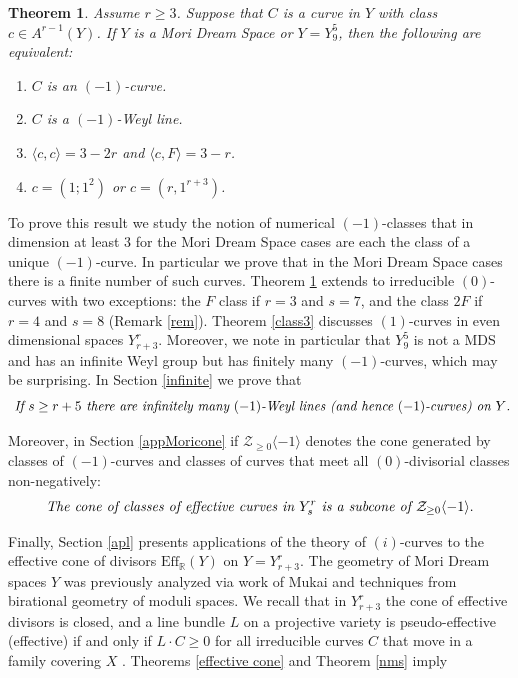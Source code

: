 \documentclass[12pt]{article}
\newtheorem{theorem}[equation]{Theorem}
\numberwithin{equation}{section}
\numberwithin{subeq}{equation}
\def\bbR{\mathbb{R}}
\begin{document}
\begin{theorem}\label{class}
Assume $r \geq 3$.  
Suppose that $C$ is a curve in $Y$ with class $c\in A^{r-1}(Y)$.
If $Y$ is a Mori Dream Space or $Y=Y^5_9$,
then the following are equivalent:
\begin{enumerate}
\item $C$ is an $(-1)$-curve.
\item $C$ is a $(-1)$-Weyl line.
\item $\langle c, c \rangle=3-2r$ and $\langle c, F \rangle = 3-r$.
\item $c = (1;1^2)$ or $c=(r,1^{r+3})$.
\end{enumerate}
\end{theorem}

To prove this result we study the notion of numerical $(-1)$-classes
that in dimension at least $3$ for the Mori Dream Space cases 
are each the class of a unique $(-1)$-curve.
In particular we prove that in the Mori Dream Space cases there is a finite number of such curves.
Theorem \ref{class} extends to irreducible $(0)$-curves with two exceptions:
the $F$ class if $r=3$ and $s=7$, and the class $2F$ if $r=4$ and $s=8$ (Remark \ref{rem}).
 Theorem \ref{class3} discusses $(1)$-curves in even dimensional spaces $Y^r_{r+3}$. Moreover, we note in particular that $Y^5_9$ is not a MDS and has an infinite Weyl group
but has finitely many $(-1)$-curves, which may be surprising. In Section \ref{infinite} we prove that
\[
\text{\emph{ If $s\geq r+5$ there are infinitely many $(-1)$-Weyl lines
(and hence $(-1)$-curves) on $Y$.}}
\]


Moreover, in Section \ref{appMoricone} if $\mathcal{Z}_{\geq 0}\langle -1 \rangle$ denotes the cone generated by classes of  $(-1)$-curves and classes of curves that meet all $(0)$-divisorial classes non-negatively:
\[
\text{\emph{The cone of classes of  effective curves in $Y^r_s$ is a subcone of $\mathcal{Z}_{\geq 0}\langle -1 \rangle$}}.
\]


Finally, Section \ref{apl} presents applications of the theory of $(i)$-curves
to the effective cone of divisors $\text{Eff}_{\bbR}(Y)$ on $Y=Y^r_{r+3}$.
The geometry of Mori Dream spaces $Y$ was previously analyzed via work of Mukai
and techniques from birational geometry of moduli spaces. We recall that in $Y^r_{r+3}$ the cone of effective divisors is closed, and
 a line bundle $L$ on a projective variety is pseudo-effective (effective) if and only if $L\cdot C\geq 0$ for all irreducible curves $C$ that move in a family covering $X$ \cite{BDPP}. Theorems \ref{effective cone} and  Theorem \ref{nms} imply
\end{document}
